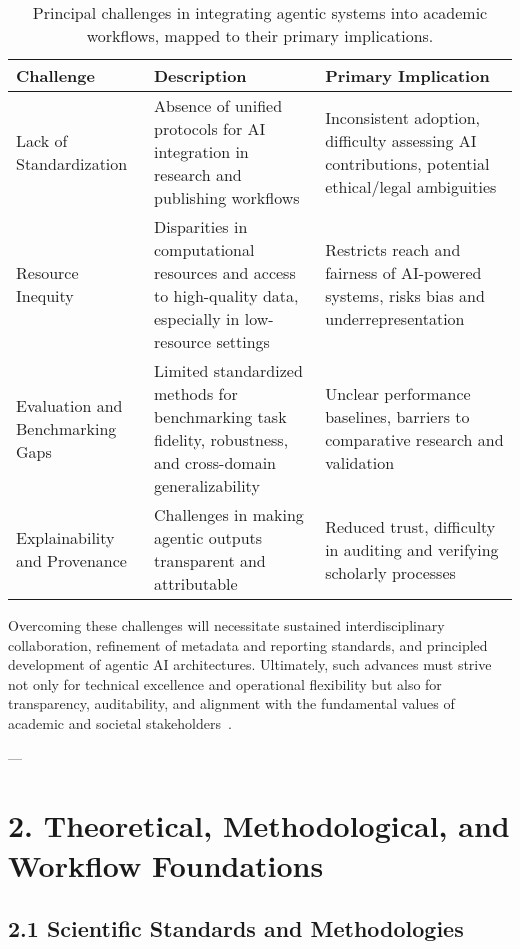 \documentclass[11pt]{article}
\begin{document}
\begin{table}[ht]
    \centering
    \caption{Principal challenges in integrating agentic systems into academic workflows, mapped to their primary implications.}
    \label{tab:challenges_comparison}
    \begin{tabular}{|p{4cm}|p{4.5cm}|p{5cm}|}
        \hline
        \textbf{Challenge} & \textbf{Description} & \textbf{Primary Implication} \\
        \hline
        Lack of Standardization & Absence of unified protocols for AI integration in research and publishing workflows & Inconsistent adoption, difficulty assessing AI contributions, potential ethical/legal ambiguities \\ 
        \hline
        Resource Inequity & Disparities in computational resources and access to high-quality data, especially in low-resource settings & Restricts reach and fairness of AI-powered systems, risks bias and underrepresentation \\
        \hline
        Evaluation and Benchmarking Gaps & Limited standardized methods for benchmarking task fidelity, robustness, and cross-domain generalizability & Unclear performance baselines, barriers to comparative research and validation  \\
        \hline
        Explainability and Provenance & Challenges in making agentic outputs transparent and attributable & Reduced trust, difficulty in auditing and verifying scholarly processes \\
        \hline
    \end{tabular}
\end{table}

Overcoming these challenges will necessitate sustained interdisciplinary collaboration, refinement of metadata and reporting standards, and principled development of agentic AI architectures. Ultimately, such advances must strive not only for technical excellence and operational flexibility but also for transparency, auditability, and alignment with the fundamental values of academic and societal stakeholders~\cite{ref101,ref102,ref103,ref104,ref105,ref106,ref111}.

---
\section{2. Theoretical, Methodological, and Workflow Foundations}

\subsection{2.1 Scientific Standards and Methodologies}
\end{document}
